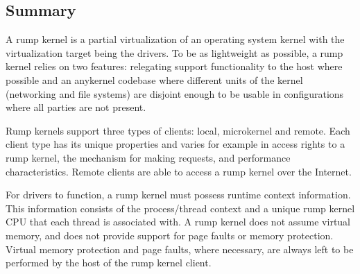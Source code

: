 \subsection{Summary}

A rump kernel is a partial virtualization of an operating system kernel
with the virtualization target being the drivers.  To be as lightweight
as possible, a rump kernel relies on two features: relegating support
functionality to the host where possible and an anykernel codebase
where different units of the kernel (\eg networking and file systems)
are disjoint enough to be usable in configurations where all parties
are not present.

Rump kernels support three types of clients: local, microkernel
and remote.  Each client type has its unique properties and varies for
example in access rights to a rump kernel, the mechanism for making
requests, and performance characteristics.  Remote clients are able to
access a rump kernel over the Internet.

For drivers to function, a rump kernel must possess runtime context
information.  This information consists of the process/thread
context and a unique rump kernel CPU that each thread is associated
with.  A rump kernel does not assume virtual memory, and does not
provide support for page faults or memory protection.  Virtual
memory protection and page faults, where necessary, are always
left to be performed by the host of the rump kernel client.
